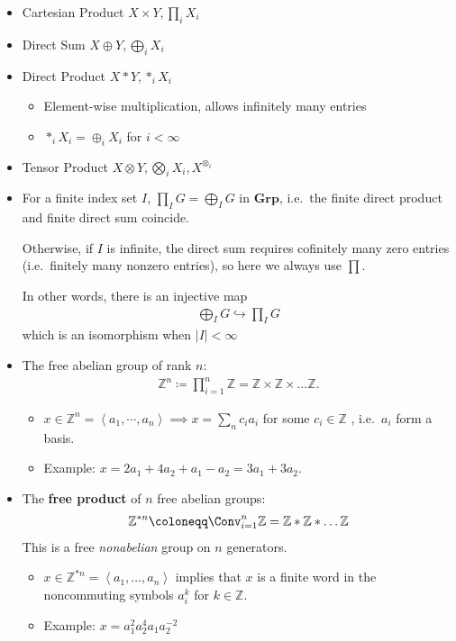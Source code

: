 \begin{itemize}
\item
  Cartesian Product \(X\times Y, \prod_i X_i\)
\item
  Direct Sum \(X \oplus Y, \bigoplus_i X_i\)
\item
  Direct Product \(X \ast Y, \ast_i X_i\)

  \begin{itemize}
  \tightlist
  \item
    Element-wise multiplication, allows infinitely many entries
  \item
    \(\ast_i X_i= \oplus_i X_i\) for \(i < \infty\)
  \end{itemize}
\item
  Tensor Product \(X \otimes Y, \bigotimes_i X_i, X^{\otimes_i}\)
\item
  For a finite index set \(I\), \(\prod_I G = \bigoplus_I G\) in
  \(\mathbf{Grp}\), i.e.~the finite direct product and finite direct sum
  coincide.

  Otherwise, if \(I\) is infinite, the direct sum requires cofinitely
  many zero entries (i.e.~finitely many nonzero entries), so here we
  always use \(\prod\).

  In other words, there is an injective map
  \begin{align*}\bigoplus_I G \hookrightarrow\prod_I G\end{align*}
  which is an isomorphism when
  \({\left\lvert {I} \right\rvert} < \infty\)
\item
  The free abelian group of rank \(n\):
  \begin{align*}
  {\mathbb{Z}}^n \coloneqq\prod_{i=1}^n {\mathbb{Z}}= {\mathbb{Z}}\times {\mathbb{Z}}\times \ldots {\mathbb{Z}}
  .\end{align*}

  \begin{itemize}
  \tightlist
  \item
    \(x \in {\mathbb{Z}}^n = \left< a_1, \cdots, a_n\right> \implies x = \sum_n c_i a_i\)
    for some \(c_i \in {\mathbb{Z}}\) , i.e.~\(a_i\) form a basis.
  \item
    Example: \(x = 2a_1 + 4a_2 + a_1 - a_2 = 3a_1 + 3a_2\).
  \end{itemize}
\item
  The \textbf{free product} of \(n\) free abelian groups:
  \begin{align*}
  {\mathbb{Z}}^{\ast n} \coloneqq\Conv_{i=1}^n {\mathbb{Z}}= {\mathbb{Z}}\ast {\mathbb{Z}}\ast \ldots {\mathbb{Z}}
  \end{align*}
  This is a free \emph{nonabelian} group on \(n\) generators.

  \begin{itemize}
  \tightlist
  \item
    \(x \in {\mathbb{Z}}^{\ast n} = \left< a_1, \ldots, a_n\right>\)
    implies that \(x\) is a finite word in the noncommuting symbols
    \(a_i^k\) for \(k\in {\mathbb{Z}}\).
  \item
    Example: \(x = a_1^2 a_2^4 a_1 a_2^{-2}\)
  \end{itemize}
\end{itemize}

